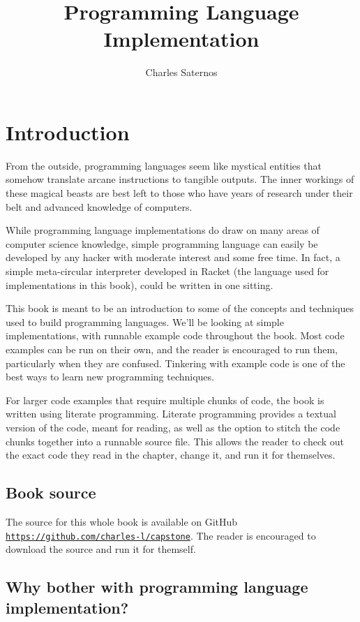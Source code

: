 \documentclass{book}
\newcommand{\sectionNewpage}{}
\newcommand{\preDoc}{}
\newcommand{\titleAndEmptyVersionAndAuthors}[3]{\title{#1}\author{#3}\maketitle}
\newcommand{\SAuthor}[1]{#1}
\newcommand{\SNumberOfAuthors}[1]{}
\let\SOriginalthesubsection\thesubsection
\let\SOriginalthesubsubsection\thesubsubsection
\newcommand{\Ssection}[2]{\section[#1]{#2}\let\thesubsection\SOriginalthesubsection}
\newcommand{\Ssubsection}[2]{\subsection[#1]{#2}\let\thesubsubsection\SOriginalthesubsubsection}
\newcommand{\Snolinkurl}[1]{\nolinkurl{#1}}
\renewcommand{\Ssection}[2]{\chapter[#1]{#2}}
\renewcommand{\Ssubsection}[2]{\section[#1]{#2}}
\begin{document}
\preDoc
\titleAndEmptyVersionAndAuthors{Programming Language Implementation}{}{\SNumberOfAuthors{1}\SAuthor{Charles Saternos}}
\label{t:x28part_x22Programmingx5fLanguagex5fImplementationx22x29}



\newpage \tableofcontents \newpage

\sectionNewpage

\Ssection{Introduction}{Introduction}\label{t:x28part_x22Introductionx22x29}

From the outside, programming languages seem like mystical entities that
somehow translate arcane instructions to tangible outputs. The inner
workings of these magical beasts are best left to those who have years of
research under their belt and advanced knowledge of computers.

While programming language implementations do draw on many areas of
computer science knowledge, simple programming language can easily be
developed by any hacker with moderate interest and some free time. In
fact, a simple meta{-}circular interpreter developed in Racket
(the language used for implementations in this book), could be written in
one sitting.

This book is meant to be an introduction to some of the concepts and
techniques used to build programming languages. We{'}ll be looking at simple
implementations, with runnable example code throughout the book. Most code
examples can be run on their own, and the reader is encouraged to run
them, particularly when they are confused. Tinkering with example code is
one of the best ways to learn new programming techniques.

For larger code examples that require multiple chunks of code, the book is
written using literate programming. Literate programming provides
a textual version of the code, meant for reading, as well as the option to
stitch the code chunks together into a runnable source file. This allows
the reader to check out the exact code they read in the chapter, change
it, and run it for themselves.

\Ssubsection{Book source}{Book source}\label{t:x28part_x22Bookx5fsourcex22x29}

The source for this whole book is available on GitHub
\href{https://github.com/charles-l/capstone}{\Snolinkurl{https://github.com/charles-l/capstone}}.
The reader is encouraged to download the source and run it for themself.

\Ssubsection{Why bother with programming language implementation?}{Why bother with programming language implementation?}\label{t:x28part_x22Whyx5fbotherx5fwithx5fprogrammingx5flanguagex5fimplementationx5fx22x29}
\end{document}
